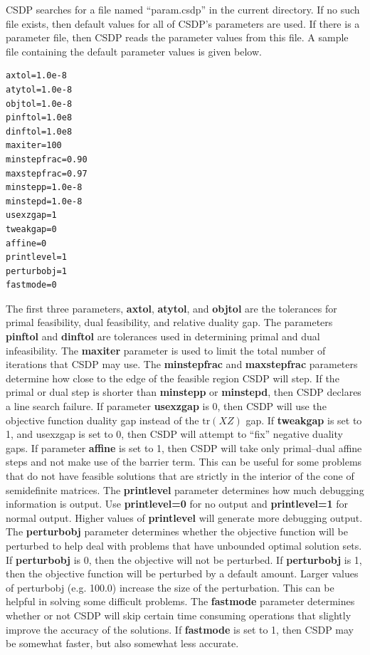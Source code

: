 \documentclass{article}
\begin{document}
CSDP searches for a file named ``param.csdp'' in the current directory.
If no such file exists, then default values for all of CSDP's parameters
are used.  If there is a parameter file, then CSDP reads the parameter
values from this file.  A sample file containing the default parameter
values is given below.  

\begin{verbatim}
axtol=1.0e-8
atytol=1.0e-8
objtol=1.0e-8
pinftol=1.0e8
dinftol=1.0e8
maxiter=100
minstepfrac=0.90
maxstepfrac=0.97
minstepp=1.0e-8
minstepd=1.0e-8
usexzgap=1
tweakgap=0
affine=0
printlevel=1
perturbobj=1
fastmode=0
\end{verbatim}

The first three parameters, {\bf axtol}, {\bf atytol}, and {\bf objtol}
are the
tolerances for primal feasibility, dual feasibility, and relative
duality gap.  The parameters {\bf pinftol} and {\bf dinftol}
are tolerances used
in determining primal and dual infeasibility.  The {\bf maxiter} parameter
is used to limit the total number of iterations that CSDP may use.
The {\bf minstepfrac} and {\bf maxstepfrac} parameters determine
how close to the
edge of the feasible region CSDP will step.  If the primal or dual
step is shorter than {\bf minstepp} or {\bf minstepd},
then CSDP declares a line
search failure.  If parameter {\bf usexzgap} is 0, then CSDP will use the
objective function duality gap instead of the   
$\mbox{tr}(XZ)$ gap.
If {\bf tweakgap} is
set to 1, and usexzgap is set to 0, then
CSDP will attempt to ``fix'' negative duality gaps.
If parameter {\bf affine} is set to 1, then CSDP will take only primal--dual
affine steps and not make use of the barrier term.  This can be useful
for some problems that do not have feasible solutions that are strictly in the
interior of the cone of semidefinite matrices.
The {\bf printlevel} parameter determines how much debugging information is
output.  Use {\bf printlevel=0} for no output and {\bf printlevel=1} for normal
output. Higher values of {\bf printlevel} will generate more debugging
output.  The {\bf perturbobj} parameter determines whether the objective
function will be perturbed to help deal with problems that have unbounded
optimal solution sets.  If {\bf perturbobj} is 0, then the objective will not
be perturbed.  If {\bf perturbobj} is 1,
then the objective function will be perturbed
by a default amount.  Larger values of perturbobj (e.g. 100.0) increase the
size of the perturbation.  This can be helpful in solving some difficult
problems. The {\bf fastmode} parameter determines whether or not
CSDP will skip certain time consuming operations that slightly improve
the accuracy of the solutions.  If {\bf fastmode} is set to
1, then CSDP may be somewhat faster, but also somewhat less accurate.   
  
\end{document}

